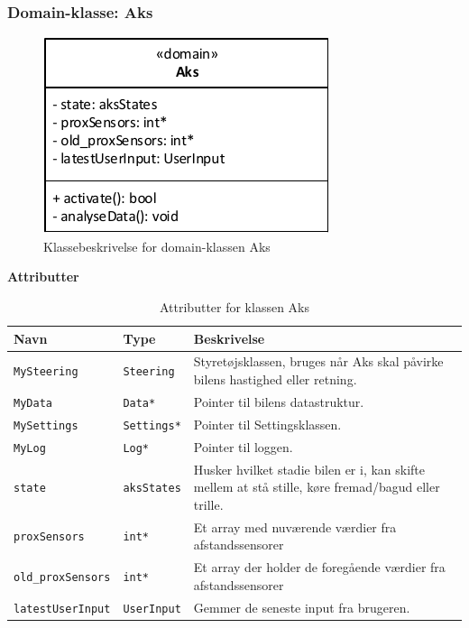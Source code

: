 \subsubsection{Domain-klasse: Aks}

\begin{figure}[h]
\centering
\includegraphics[scale=1]{../fig/diagrammer/bil/cd_aks.pdf}
\caption{Klassebeskrivelse for domain-klassen Aks}
\label{fig:cd_aks}
\end{figure}

\textbf{Attributter}

\begin{table}[h]
\begin{tabularx}{\textwidth}{| Z | Z | L{9cm} |} \hline
Navn & Type & Beskrivelse \\\hline
\texttt{MySteering} & \texttt{Steering} & Styretøjsklassen, bruges når Aks skal påvirke bilens hastighed eller retning.\\\hline
\texttt{MyData} & \texttt{Data*} & Pointer til bilens datastruktur.\\\hline
\texttt{MySettings} & \texttt{Settings*} & Pointer til Settingsklassen. \\\hline
\texttt{MyLog} & \texttt{Log*} & Pointer til loggen. \\\hline
\texttt{state} & \texttt{aksStates} & Husker hvilket stadie bilen er i, kan skifte mellem at stå stille, køre fremad/bagud eller trille. \\\hline
\texttt{proxSensors} & \texttt{int*} & Et array med nuværende værdier fra afstandssensorer \\\hline
\texttt{old\_proxSensors} & \texttt{int*} & Et array der holder de foregående værdier fra afstandssensorer \\\hline
\texttt{latestUserInput} & \texttt{UserInput} & Gemmer de seneste input fra brugeren. \\ \hline
\end{tabularx}
\caption{Attributter for klassen Aks}
\label{table:attr_aks}
\end{table}

